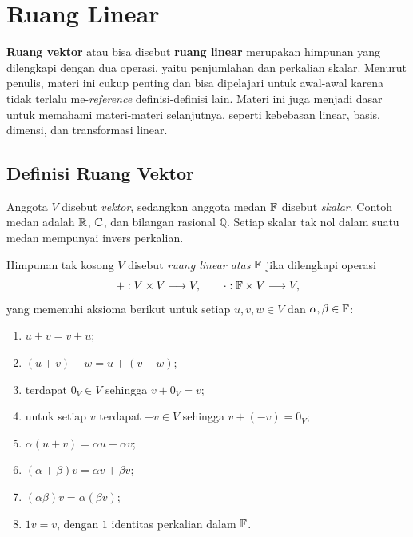 \chapter{Ruang Linear}
\label{ch:ruang-linear}

\textbf{Ruang vektor} atau bisa disebut \textbf{ruang linear}  merupakan himpunan yang dilengkapi dengan dua operasi, yaitu penjumlahan dan perkalian skalar. Menurut penulis, materi ini cukup penting dan bisa dipelajari untuk awal-awal karena tidak terlalu me-\textit{reference} definisi-definisi lain. Materi ini juga menjadi dasar untuk memahami materi-materi selanjutnya, seperti kebebasan linear, basis, dimensi, dan transformasi linear.

\section{Definisi Ruang Vektor}
\label{linear:aksioma}
Anggota $V$ disebut \emph{vektor}, sedangkan anggota medan $\mathbb{F}$
disebut \emph{skalar}. Contoh medan adalah $\mathbb{R}$, $\mathbb{C}$, dan
bilangan rasional $\mathbb Q$. Setiap skalar tak nol dalam suatu
medan mempunyai invers perkalian.

\begin{definisi}
    Himpunan tak kosong $V$ disebut \emph{ruang linear atas $\mathbb{F}$}
    jika dilengkapi operasi
    \[
        +:V\times V\longrightarrow V,
        \qquad
        \cdot:\mathbb{F}\times V\longrightarrow V,
    \]
    yang memenuhi aksioma berikut untuk setiap $u,v,w\in V$
    dan $\alpha,\beta\in\mathbb{F}$:
    \begin{enumerate}[label=(\roman*),nosep]
        \item $u+v=v+u$;
        \item $(u+v)+w=u+(v+w)$;
        \item terdapat $0_V\in V$ sehingga $v+0_V=v$;
        \item untuk setiap $v$ terdapat $-v\in V$ sehingga $v+(-v)=0_V$;
        \item $\alpha(u+v)=\alpha u+\alpha v$;
        \item $(\alpha+\beta)v=\alpha v+\beta v$;
        \item $(\alpha\beta)v=\alpha(\beta v)$;
        \item $1v=v$, dengan $1$ identitas perkalian dalam $\mathbb{F}$.
    \end{enumerate}
\end{definisi}

